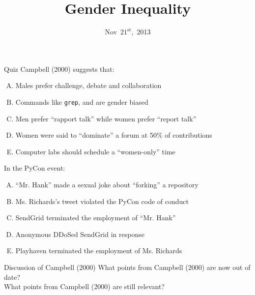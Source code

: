 \documentclass{beamer}
\title{Gender Inequality}
\date{Nov~$21^{\text{st}}$,~2013}
\begin{document}
\begin{frame}
\titlepage
\end{frame}

\begin{frame}{Quiz}
Campbell (2000) suggests that:
\begin{enumerate}[(A)]
\item<1> Males prefer challenge, debate and collaboration %
\item<1> Commands like \texttt{grep},  and  are gender biased %
\item<1> Men prefer ``rapport talk'' while women prefer ``report talk'' %
\item<1> Women were said to ``dominate'' a forum at 50\% of contributions %
\item<1-2> Computer labs should schedule a ``women-only'' time
\end{enumerate}
\bigskip
In the PyCon event:
\begin{enumerate}[(A)]
\item<1> ``Mr. Hank'' made a sexual joke about ``forking'' a repository %
\item<1> Ms. Richards's tweet violated the PyCon code of conduct %
\item<1> SendGrid terminated the employment of ``Mr. Hank'' %
\item<1-2> Anonymous DDoSed SendGrid in response
\item<1> Playhaven terminated the employment of Ms. Richards %
\end{enumerate}
\end{frame}

\begin{frame}{Discussion of Campbell (2000)}
What points from Campbell (2000) are now out of date?\\[5em]
What points from Campbell (2000) are still relevant?
\end{frame}
\end{document}
